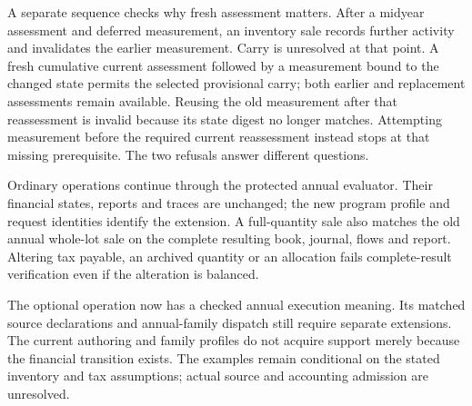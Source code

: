 A separate sequence checks why fresh assessment matters. After a midyear
assessment and deferred measurement, an inventory sale records further
activity and invalidates the earlier measurement. Carry is unresolved at that
point. A fresh cumulative current assessment followed by a measurement bound
to the changed state permits the selected provisional carry; both earlier and
replacement assessments remain available. Reusing the old measurement after
that reassessment is invalid because its state digest no longer matches.
Attempting measurement before the required current reassessment instead stops
at that missing prerequisite. The two refusals answer different questions.

Ordinary operations continue through the protected annual evaluator. Their
financial states, reports and traces are unchanged; the new program profile
and request identities identify the extension. A full-quantity sale also
matches the old annual whole-lot sale on the complete resulting book, journal,
flows and report. Altering tax payable, an archived quantity or an allocation
fails complete-result verification even if the alteration is balanced.

The optional operation now has a checked annual execution meaning. Its matched
source declarations and annual-family dispatch still require separate
extensions. The current authoring and family profiles do not acquire support
merely because the financial transition exists. The examples remain conditional
on the stated inventory and tax assumptions; actual source and accounting
admission are unresolved.
